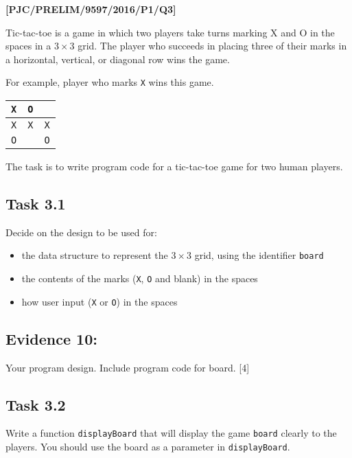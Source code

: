 \item \textbf{{[}PJC/PRELIM/9597/2016/P1/Q3{]} }

Tic-tac-toe is a game in which two players take turns marking X and
O in the spaces in a $3\times3$ grid. The player who succeeds in
placing three of their marks in a horizontal, vertical, or diagonal
row wins the game.

For example, player who marks \texttt{X} wins this game. 
\noindent \begin{center}
\begin{tabular}{|c|c|c|}
\hline 
\texttt{X} & \texttt{O} & \tabularnewline
\hline 
\texttt{X} & \texttt{X} & \texttt{X}\tabularnewline
\hline 
\texttt{O} &  & \texttt{O}\tabularnewline
\hline 
\end{tabular}
\par\end{center}

The task is to write program code for a tic-tac-toe game for two human
players. 

\subsection*{Task 3.1 }

Decide on the design to be used for:
\begin{itemize}
\item the data structure to represent the $3\times3$ grid, using the identifier
\texttt{board}
\item the contents of the marks (\texttt{X}, \texttt{O} and blank) in the
spaces
\item how user input (\texttt{X} or \texttt{O}) in the spaces 
\end{itemize}

\subsection*{Evidence 10:}

Your program design. Include program code for board. \hfill{} {[}4{]}

\subsection*{Task 3.2 }

Write a function \texttt{displayBoard} that will display the game
\texttt{board} clearly to the players. You should use the board as
a parameter in \texttt{displayBoard}. 

